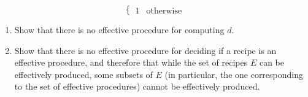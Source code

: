 {\begin{enumerate}
\begin{enumerate}
$$\begin{cases}
	1 & \text{otherwise}	
	\end{cases}$$ \begin{enumerate}
		\item Show that there is no effective procedure for computing $d$.  
		\item Show that there is no effective procedure for deciding if a recipe is an effective procedure, and therefore that while the set of recipes $E$ can be effectively produced, some subsets of $E$ (in particular, the one corresponding to the set of effective procedures) cannot be effectively produced.
			\end{enumerate} 
\end{enumerate}

\end{enumerate}

}






